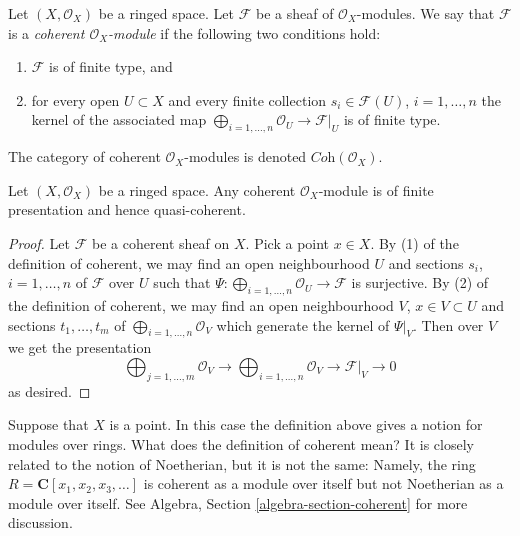 \begin{definition}
\label{definition-coherent}
Let $(X, \mathcal{O}_X)$ be a ringed space.
Let $\mathcal{F}$ be a sheaf of $\mathcal{O}_X$-modules.
We say that $\mathcal{F}$ is a {\it coherent $\mathcal{O}_X$-module}
if the following two conditions hold:
\begin{enumerate}
\item $\mathcal{F}$ is of finite type, and
\item for every open $U \subset X$ and every finite
collection $s_i \in \mathcal{F}(U)$, $i = 1, \ldots, n$
the kernel of the associated map
$\bigoplus_{i = 1, \ldots, n} \mathcal{O}_U \to \mathcal{F}|_U$
is of finite type.
\end{enumerate}
The category of coherent $\mathcal{O}_X$-modules is denoted
$\textit{Coh}(\mathcal{O}_X)$.
\end{definition}

\begin{lemma}
\label{lemma-coherent-finite-presentation}
Let $(X, \mathcal{O}_X)$ be a ringed space.
Any coherent $\mathcal{O}_X$-module is of finite presentation
and hence quasi-coherent.
\end{lemma}

\begin{proof}
Let $\mathcal{F}$ be a coherent sheaf on $X$.
Pick a point $x \in X$.
By (1) of the definition of coherent, we may find an open neighbourhood $U$
and sections $s_i$, $i = 1, \ldots, n$ of $\mathcal{F}$ over $U$
such that $\Psi : \bigoplus_{i = 1, \ldots, n} \mathcal{O}_U \to \mathcal{F}$
is surjective. By (2) of the definition of coherent, we may find
an open neighbourhood $V$, $x \in V \subset U$ and sections
$t_1, \ldots, t_m$ of $\bigoplus_{i = 1, \ldots, n} \mathcal{O}_V$
which generate the kernel of $\Psi|_V$. Then over $V$ we get the
presentation
$$
\bigoplus\nolimits_{j = 1, \ldots, m}
\mathcal{O}_V
\longrightarrow
\bigoplus\nolimits_{i = 1, \ldots, n}
\mathcal{O}_V
\to
\mathcal{F}|_V
\to
0
$$
as desired.
\end{proof}

\begin{example}
\label{example-coherent-not-Noetherian}
Suppose that $X$ is a point. In this case the definition
above gives a notion for modules over rings.
What does the definition of coherent mean?
It is closely related to the notion of Noetherian,
but it is not the same: Namely, the ring
$R = \mathbf{C}[x_1, x_2, x_3, \ldots]$ is coherent
as a module over itself but not Noetherian as a module
over itself. See Algebra, Section \ref{algebra-section-coherent}
for more discussion.
\end{example}

